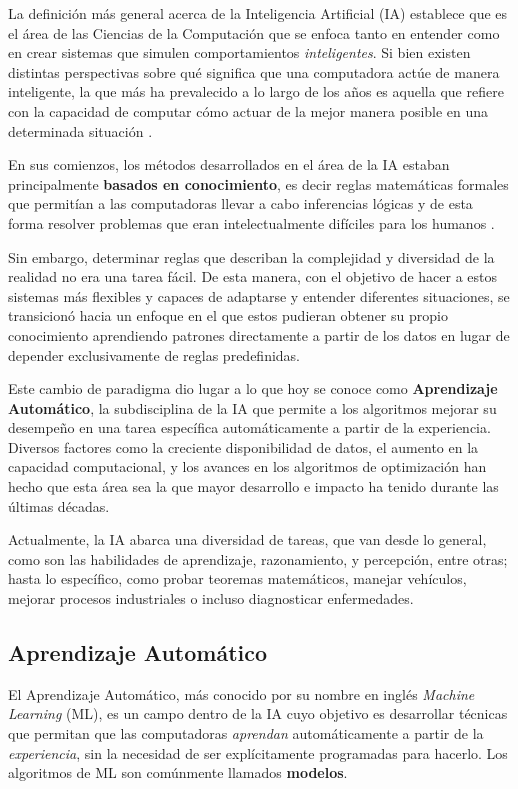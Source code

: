 \documentclass[../../main.tex]{subfiles}
\begin{document}
La definición más general acerca de la Inteligencia Artificial (IA) establece que es el área de las Ciencias de la Computación que se enfoca tanto en entender como en crear sistemas que simulen comportamientos \textit{inteligentes}. Si bien existen distintas perspectivas sobre qué significa que una computadora actúe de manera inteligente, la que más ha prevalecido a lo largo de los años es aquella que refiere con la capacidad de computar cómo actuar de la mejor manera posible en una determinada situación \cite{ai-a-modern-approach}. 

En sus comienzos, los métodos desarrollados en el área de la IA estaban principalmente \textbf{basados en conocimiento}, es decir reglas matemáticas formales que permitían a las computadoras llevar a cabo inferencias lógicas y de esta forma resolver problemas que eran intelectualmente difíciles para los humanos \cite{deep-learning}.

Sin embargo, determinar reglas que describan la complejidad y diversidad de la realidad no era una tarea fácil. De esta manera, con el objetivo de hacer a estos sistemas más flexibles y capaces de adaptarse y entender diferentes situaciones, se transicionó hacia un enfoque en el que estos pudieran obtener su propio conocimiento aprendiendo patrones directamente a partir de los datos en lugar de depender exclusivamente de reglas predefinidas.

Este cambio de paradigma dio lugar a lo que hoy se conoce como \textbf{Aprendizaje Automático}, la subdisciplina de la IA que permite a los algoritmos mejorar su desempeño en una tarea específica automáticamente a partir de la experiencia. Diversos factores como la creciente disponibilidad de datos, el aumento en la capacidad computacional, y los avances en los algoritmos de optimización \cite{deep-learning} han hecho que esta área sea la que mayor desarrollo e impacto ha tenido durante las últimas décadas. 

Actualmente, la IA abarca una diversidad de tareas, que van desde lo general, como son las habilidades de aprendizaje, razonamiento, y percepción, entre otras; hasta lo específico, como probar teoremas matemáticos, manejar vehículos, mejorar procesos industriales o incluso diagnosticar enfermedades.

\subsection{Aprendizaje Automático}
El Aprendizaje Automático, más conocido por su nombre en inglés \textit{Machine Learning} (ML), es un campo dentro de la IA cuyo objetivo es desarrollar técnicas que permitan que las computadoras \textit{aprendan} automáticamente a partir de la \textit{experiencia}, sin la necesidad de ser explícitamente programadas para hacerlo. Los algoritmos de ML son comúnmente llamados \textbf{modelos}.
\end{document}

